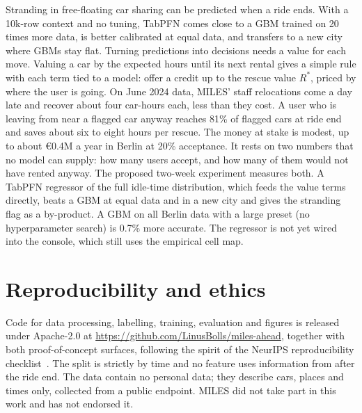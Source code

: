 \documentclass[11pt,a4paper]{article}
\newcommand{\eur}[1]{\euro{}#1}
\begin{document}
Stranding in free-floating car sharing can be predicted when a ride ends. With a 10k-row context and no tuning, TabPFN comes close to a GBM trained on 20 times more data, is better calibrated at equal data, and transfers to a new city where GBMs stay flat. Turning predictions into decisions needs a value for each move. Valuing a car by the expected hours until its next rental gives a simple rule with each term tied to a model: offer a credit up to the rescue value $R^\ast$, priced by where the user is going. On June 2024 data, MILES' staff relocations come a day late and recover about four car-hours each, less than they cost. A user who is leaving from near a flagged car anyway reaches 81\% of flagged cars at ride end and saves about six to eight hours per rescue. The money at stake is modest, up to about \eur{0.4M} a year in Berlin at 20\% acceptance. It rests on two numbers that no model can supply: how many users accept, and how many of them would not have rented anyway. The proposed two-week experiment measures both. A TabPFN regressor of the full idle-time distribution, which feeds the value terms directly, beats a GBM at equal data and in a new city and gives the stranding flag as a by-product. A GBM on all Berlin data with a large preset (no hyperparameter search) is 0.7\% more accurate. The regressor is not yet wired into the console, which still uses the empirical cell map.

\section{Reproducibility and ethics}

Code for data processing, labelling, training, evaluation and figures is released under Apache-2.0 at \url{https://github.com/LinusBolls/miles-ahead}, together with both proof-of-concept surfaces, following the spirit of the NeurIPS reproducibility checklist~\citep{pineau2021reproducibility}. The split is strictly by time and no feature uses information from after the ride end. The data contain no personal data; they describe cars, places and times only, collected from a public endpoint. MILES did not take part in this work and has not endorsed it.



\end{document}
